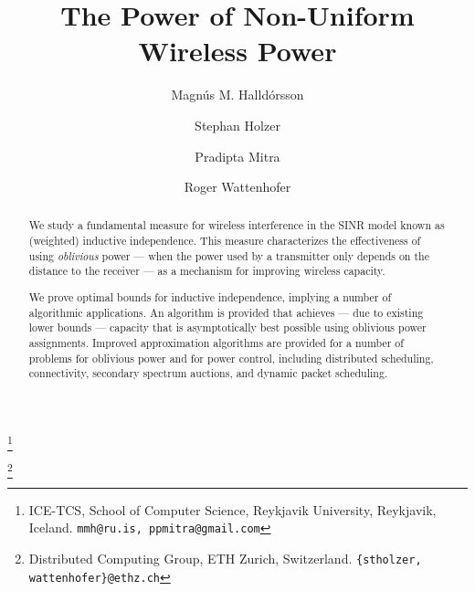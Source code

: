\documentclass[11pt]{amsart}
\begin{document}
\title{\Large The Power of Non-Uniform Wireless Power}







\author{Magn\'us M. Halld\'orsson}
\thanks{ICE-TCS, School of Computer Science,
    Reykjavik University, Reykjavik, Iceland. 
    \texttt{mmh@ru.is, ppmitra@gmail.com}}
\author{Stephan Holzer}
\thanks{Distributed Computing Group, ETH Zurich, Switzerland. \texttt{\{stholzer, wattenhofer\}@ethz.ch}}
\author{Pradipta Mitra} 

\author{Roger Wattenhofer}

\date{}



\begin{abstract}
We study a fundamental measure for wireless interference in the SINR model
known as (weighted) inductive independence.
This measure characterizes the effectiveness of using \emph{oblivious} power --- when 
the power used by a transmitter only depends on the distance to the receiver  --- as
a mechanism for improving wireless capacity. 

We prove optimal bounds for inductive independence, implying a number of algorithmic
applications. An algorithm is provided that achieves --- due to existing lower bounds --- capacity that is asymptotically best possible using oblivious power assignments. Improved
approximation algorithms are provided for a number of problems for oblivious
power and for power control, including distributed scheduling, connectivity, secondary
spectrum auctions, and dynamic packet scheduling.
\end{abstract}

\iffalse
\begin{abstract}
We study a  fundamental measure for wireless interference in the SINR model.
This measure characterizes the effectiveness of using \emph{oblivious} power --- when 
the power used by a transmitter only depends on the distance to the receiver  --- as
a mechanism for improving wireless capacity. 

We prove optimal bounds for this measure, implying a number of algorithmic
applications. An algorithm is provided that achieves---due to existing lower bounds---a capacity that is asymptotically best possible using oblivious power assignments. Improved
approximation algorithms are provided for a number of problems for oblivious
power and for power control --- including distributed scheduling, secondary
spectrum auctions, wireless connectivity, and dynamic packet scheduling.
\end{abstract}
\fi
\end{document}
